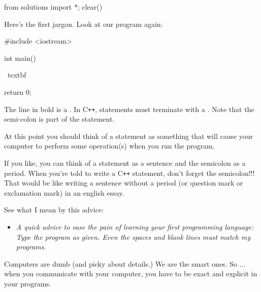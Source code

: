 \begin{python0}
from solutions import *; clear()
\end{python0}

Here's the first jargon. Look at our program again:
\begin{console}[commandchars=\~\%\@]
#include <iostream>

int main()
{
    ~textbf%

    return 0;
}
\end{console}

The line in bold is a 
. 
In C\texttt{++}, statements must terminate with a 
. 
Note that the semi-colon is part of the statement. 

At this point you should think of a statement as something that will cause 
your computer to perform some operation(s) when you run the program.

If you like, you can think of a statement as a sentence and the semicolon as a
period. When you're told to write a C\texttt{++} statement, don't forget the 
semicolon!!! 
That would be like writing a sentence without a period (or question mark or 
exclamation mark) in an english essay.




See what I mean by this advice:

\begin{itemize}
\item[]
\textit{A quick advice to ease the pain of learning your first programming 
language: Type the program 
 as given. 
Even the spaces and blank lines must match my programs.}
\end{itemize}

Computers are dumb (and picky about details.) 
We are the smart ones. So ... when you communicate with your computer, 
you have to be exact and explicit in your programs.



